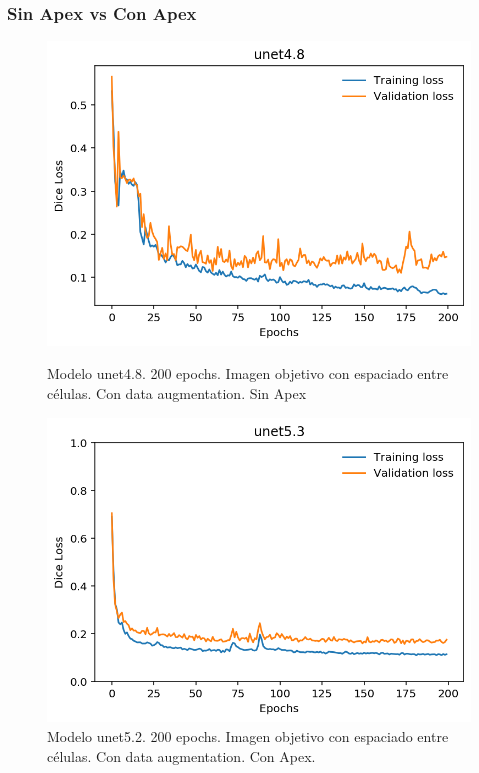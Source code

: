 \clearpage \subsubsection{Sin Apex vs Con Apex}
\begin{figure}[ht]
\centering
\includegraphics[scale=0.8]{img/unet4.8-200e-aug.png} 
\caption{Modelo unet4.8. 200 epochs. Imagen objetivo con espaciado entre células. Con data augmentation. Sin Apex}\bigskip 
\includegraphics[scale=0.8]{img/unet5.2-sample-200e-target-apex.png} 
\caption{Modelo unet5.2. 200 epochs. Imagen objetivo con espaciado entre células. Con data augmentation. Con Apex.}\bigskip 
\end{figure}

